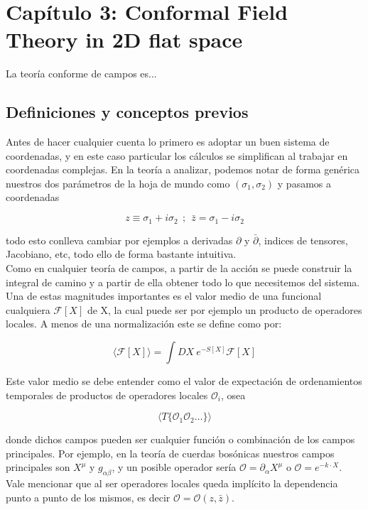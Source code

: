 \documentclass[]{article}
\begin{document}
\section*{Capítulo 3: Conformal Field Theory in 2D flat space }

La teoría conforme de campos es...

\subsection*{Definiciones y conceptos previos}

Antes de hacer cualquier cuenta lo primero es adoptar un buen sistema de coordenadas, y en este caso particular los cálculos se simplifican al trabajar en coordenadas complejas. En la teoría a analizar, podemos notar de forma genérica nuestros dos parámetros de la hoja de mundo como $ (\sigma_1,\sigma_2) $ y pasamos a coordenadas

\begin{equation}\label{complex}
z \equiv \sigma_1 + i \sigma_2 \ \ ; \ \ \bar{z}= \sigma_1 - i\sigma_2
\end{equation} 

\noindent todo esto conlleva cambiar por ejemplos a derivadas $ \partial $ y $ \bar{\partial} $, indices de tensores, Jacobiano, etc, todo ello de forma bastante intuitiva.\\

Como en cualquier teoría de campos, a partir de la acción se puede construir la integral de camino y a partir de ella obtener todo lo que necesitemos del sistema. Una de estas magnitudes importantes es el valor medio de una funcional cualquiera $ \mathcal{F}[X] $ de X, la cual puede ser por ejemplo un producto de operadores locales. A menos de una normalización este se define como por:

\begin{equation}\label{meanvalue}
\langle \mathcal{F}[X] \rangle = \int DX \ e^{-S[X]} \mathcal{F}[X]
\end{equation} 

\noindent Este valor medio se debe entender como el valor de expectación de ordenamientos temporales de productos de operadores locales $ \mathscr{O}_i $, osea 

\begin{equation}\label{key}
\langle T\{\mathcal{O}_1\mathcal{O}_2\dots\}\rangle
\end{equation} 

\noindent donde dichos campos pueden ser cualquier función o combinación de los campos principales. Por ejemplo, en la teoría de cuerdas bosónicas nuestros campos principales son $ X^{\mu} $ y $ g_{\alpha \beta} $, y un posible operador sería $ \mathcal{O}=\partial_{\alpha} X^{\mu} $ o $ \mathcal{O}=e^{-k \cdot X} $. Vale mencionar que al ser operadores locales queda implícito la dependencia punto a punto de los mismos, es decir $\mathcal{O}=\mathcal{O}(z,\bar{z})$.\\
\end{document}
